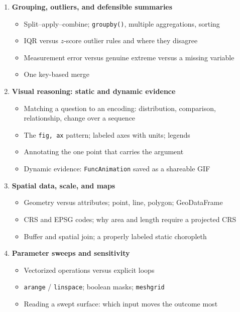 \documentclass[11pt]{article}
\begin{document}
\begin{enumerate}
\begin{itemize}
          \item Docstrings and type hints; filtering, derived columns, and CSV export
        \end{itemize}
  \item \textbf{Grouping, outliers, and defensible summaries}
        \begin{itemize}
          \item Split--apply--combine; \texttt{groupby()}, multiple aggregations, sorting
          \item IQR versus $z$-score outlier rules and where they disagree
          \item Measurement error versus genuine extreme versus a missing variable
          \item One key-based merge
        \end{itemize}
  \item \textbf{Visual reasoning: static and dynamic evidence}
        \begin{itemize}
          \item Matching a question to an encoding: distribution, comparison, relationship,
                change over a sequence
          \item The \texttt{fig, ax} pattern; labeled axes with units; legends
          \item Annotating the one point that carries the argument
          \item Dynamic evidence: \texttt{FuncAnimation} saved as a shareable GIF
        \end{itemize}
  \item \textbf{Spatial data, scale, and maps}
        \begin{itemize}
          \item Geometry versus attributes; point, line, polygon; GeoDataFrame
          \item CRS and EPSG codes; why area and length require a projected CRS
          \item Buffer and spatial join; a properly labeled static choropleth
        \end{itemize}
  \item \textbf{Parameter sweeps and sensitivity}
        \begin{itemize}
          \item Vectorized operations versus explicit loops
          \item \texttt{arange} / \texttt{linspace}; boolean masks; \texttt{meshgrid}
          \item Reading a swept surface: which input moves the outcome most

\end{itemize}
\end{enumerate}
\end{document}
